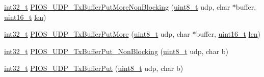 \begin{DoxyCompactItemize}
\item 
\hyperlink{group___n_a_m_e_gafd12020da5a235dfcf0c3c748fb5baed}{int32\-\_\-t} \hyperlink{group___p_i_o_s___u_d_p_ga4022689f32ee127e513d0b45cc245ef2}{P\-I\-O\-S\-\_\-\-U\-D\-P\-\_\-\-Tx\-Buffer\-Put\-More\-Non\-Blocking} (\hyperlink{stdint_8h_aba7bc1797add20fe3efdf37ced1182c5}{uint8\-\_\-t} udp, char $\ast$buffer, \hyperlink{stdint_8h_a273cf69d639a59973b6019625df33e30}{uint16\-\_\-t} \hyperlink{mavlink__helpers_8h_aba59486c1504340293255a065b546e3a}{len})
\item 
\hyperlink{group___n_a_m_e_gafd12020da5a235dfcf0c3c748fb5baed}{int32\-\_\-t} \hyperlink{group___p_i_o_s___u_d_p_ga8869ef7484833f6b65a75deff15c6392}{P\-I\-O\-S\-\_\-\-U\-D\-P\-\_\-\-Tx\-Buffer\-Put\-More} (\hyperlink{stdint_8h_aba7bc1797add20fe3efdf37ced1182c5}{uint8\-\_\-t} udp, char $\ast$buffer, \hyperlink{stdint_8h_a273cf69d639a59973b6019625df33e30}{uint16\-\_\-t} \hyperlink{mavlink__helpers_8h_aba59486c1504340293255a065b546e3a}{len})
\item 
\hyperlink{group___n_a_m_e_gafd12020da5a235dfcf0c3c748fb5baed}{int32\-\_\-t} \hyperlink{group___p_i_o_s___u_d_p_gaab40450ed2cf83ee3bd4273982fec385}{P\-I\-O\-S\-\_\-\-U\-D\-P\-\_\-\-Tx\-Buffer\-Put\-\_\-\-Non\-Blocking} (\hyperlink{stdint_8h_aba7bc1797add20fe3efdf37ced1182c5}{uint8\-\_\-t} udp, char b)
\item 
\hyperlink{group___n_a_m_e_gafd12020da5a235dfcf0c3c748fb5baed}{int32\-\_\-t} \hyperlink{group___p_i_o_s___u_d_p_ga07cb98ed051970964d063ee0d58c594f}{P\-I\-O\-S\-\_\-\-U\-D\-P\-\_\-\-Tx\-Buffer\-Put} (\hyperlink{stdint_8h_aba7bc1797add20fe3efdf37ced1182c5}{uint8\-\_\-t} udp, char b)
\end{DoxyCompactItemize}
